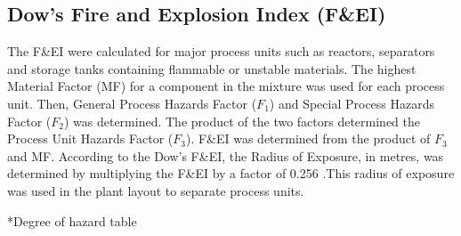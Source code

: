 \subsection{Dow's Fire and Explosion Index (F\&EI)}
The F\&EI were calculated for major process units such as reactors, separators and storage tanks containing flammable or unstable materials. The highest Material Factor (MF) for a component in the mixture was used for each process unit. Then, General Process Hazards Factor ($F_1$) and Special Process Hazards Factor ($F_2$) was determined. The product of the two factors determined the Process Unit Hazards Factor ($F_3$). F\&EI was determined from the product of $F_3$ and MF. According to the Dow's F\&EI, the Radius of Exposure, in metres, was determined by multiplying the F\&EI by a factor of 0.256 \cite{aiche_dows_1994}.This radius of exposure was used in the plant layout to separate process units.   

*Degree of hazard table

